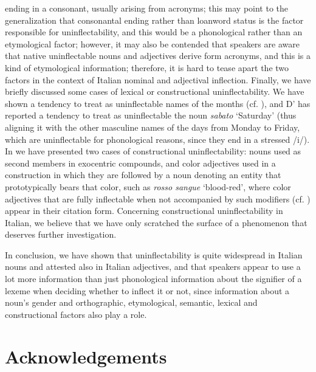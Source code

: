 \documentclass[output=paper]{langscibook}
\begin{document}
ending in a consonant, usually arising from acronyms; this may point to the generalization that consonantal ending rather than loanword status is the factor responsible for uninflectability, and this would be a phonological rather than an etymological factor; however, it may also be contended that speakers are aware that native uninflectable nouns and adjectives derive form acronyms, and this is a kind of etymological information; therefore, it is hard to tease apart the two factors in the context of Italian nominal and adjectival inflection. Finally, we have briefly discussed some cases of lexical or constructional uninflectability. We have shown a tendency to treat as uninflectable names of the months (cf. ), and D’\citet[196]{Achille2005a} has reported a tendency to treat as uninflectable the noun \textit{sabato} ‘Saturday’ (thus aligning it with the other masculine names of the days from Monday to Friday, which are uninflectable for phonological reasons, since they end in a stressed /i/). In  we have presented two cases of constructional uninflectability:  nouns used as second members in exocentric compounds, and color adjectives used in a construction in which they are followed by a noun denoting an entity that prototypically bears that color, such as \textit{rosso sangue} ‘blood-red’, where color adjectives that are fully inflectable when not accompanied by such modifiers (cf. ) appear in their citation form. Concerning constructional uninflectability in Italian, we believe that we have only scratched the surface of a phenomenon that deserves further investigation.

In conclusion, we have shown that uninflectability is quite widespread in Italian nouns and attested also in Italian adjectives, and that speakers appear to use a lot more information than just phonological information about the signifier of a lexeme when deciding whether to inflect it or not, since information about a noun’s gender and orthographic, etymological, semantic, lexical and constructional factors also play a role.

\section{Acknowledgements}
\end{document}
